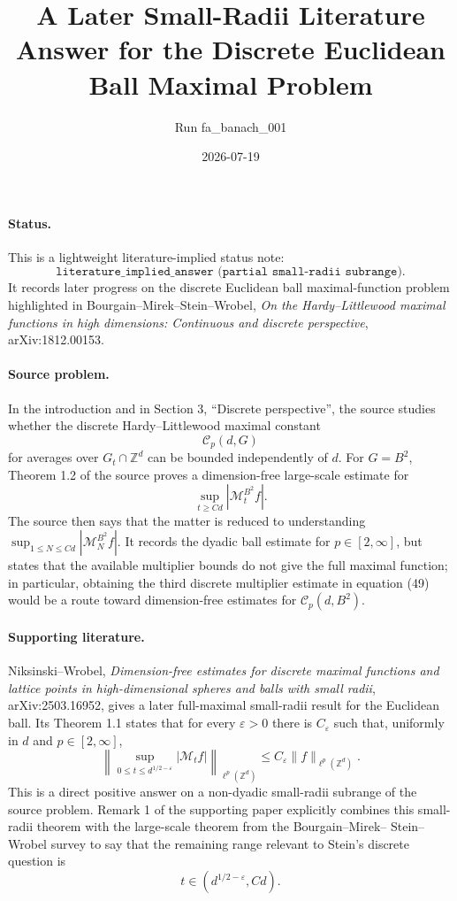 \documentclass[11pt]{article}
\title{A Later Small-Radii Literature Answer for the Discrete Euclidean Ball Maximal Problem}
\author{Run fa\_banach\_001}
\date{2026-07-19}
\newcommand{\Z}{\mathbb Z}
\begin{document}
\maketitle

\paragraph{Status.}
This is a lightweight literature-implied status note:
\[
\texttt{literature\_implied\_answer (partial small-radii subrange).}
\]
It records later progress on the discrete Euclidean ball maximal-function
problem highlighted in Bourgain--Mirek--Stein--Wrobel,
\emph{On the Hardy--Littlewood maximal functions in high dimensions:
Continuous and discrete perspective}, arXiv:1812.00153.

\paragraph{Source problem.}
In the introduction and in Section 3, ``Discrete perspective'', the source
studies whether the discrete Hardy--Littlewood maximal constant
\[
\mathcal C_p(d,G)
\]
for averages over \(G_t\cap\Z^d\) can be bounded independently of \(d\).
For \(G=B^2\), Theorem 1.2 of the source proves a dimension-free large-scale
estimate for
\[
\sup_{t\ge Cd}|\mathcal M_t^{B^2}f|.
\]
The source then says that the matter is reduced to understanding
\(\sup_{1\le N\le Cd}|\mathcal M_N^{B^2}f|\).  It records the dyadic ball
estimate for \(p\in[2,\infty]\), but states that the available multiplier
bounds do not give the full maximal function; in particular, obtaining the
third discrete multiplier estimate in equation (49) would be a route toward
dimension-free estimates for \(\mathcal C_p(d,B^2)\).

\paragraph{Supporting literature.}
Niksinski--Wrobel,
\emph{Dimension-free estimates for discrete maximal functions and lattice
points in high-dimensional spheres and balls with small radii},
arXiv:2503.16952, gives a later full-maximal small-radii result for the
Euclidean ball.  Its Theorem 1.1 states that for every \(\varepsilon>0\) there
is \(C_\varepsilon\) such that, uniformly in \(d\) and \(p\in[2,\infty]\),
\[
\left\|\sup_{0\le t\le d^{1/2-\varepsilon}}
|\mathcal M_t f|\right\|_{\ell^p(\Z^d)}
\le C_\varepsilon\|f\|_{\ell^p(\Z^d)}.
\]
This is a direct positive answer on a non-dyadic small-radii subrange of the
source problem.  Remark 1 of the supporting paper explicitly combines this
small-radii theorem with the large-scale theorem from the Bourgain--Mirek--
Stein--Wrobel survey to say that the remaining range relevant to Stein's
discrete question is
\[
t\in(d^{1/2-\varepsilon},Cd).
\]
\end{document}

